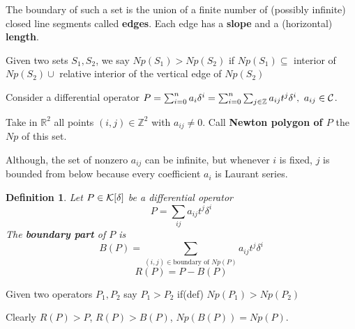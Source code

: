 \documentclass[11pt]{article}
\newtheorem{dfn}[thm]{Definition}
\newcommand{\reals}{\mathbb R}
\newcommand{\intg}{\mathbb Z}
\newcommand{\calc}{{\cal C}}
\newcommand{\calk}{{\cal K}}
\begin{document}
The boundary of such a set is the union of a finite number of (possibly infinite) closed line segments called \textbf{edges}. Each edge has a \textbf{slope} and a (horizontal) \textbf{length}.

Given two sets $S_1,S_2$, we say $Np(S_1)>Np(S_2)$ if $Np(S_1)\subseteq $ interior of $Np(S_2)\cup$ relative interior of the vertical edge of $Np(S_2)$


Consider a differential operator
$P=\sum^n_{i=0}a_i\delta^i=\sum^n_{i=0}\sum_{j\in \intg}a_{ij}t^j\delta^i,\ a_{ij}\in\calc$.

Take in $\reals^2$ all points $(i,j)\in \intg^2$ with $a_{ij}\neq 0$. Call \textbf{Newton polygon of $P$} the $Np$ of this set.

Although, the set of nonzero $a_{ij}$ can be infinite, but whenever $i$ is fixed, $j$ is bounded from below because every coefficient $a_i$ is Laurant series.

\begin{dfn}
Let $P\in \calk[\delta]$ be a differential operator
$$
P=\sum_{ij}a_{ij}t^j\delta^i
$$
The \textbf{boundary part} of $P$ is 
$$
B(P)=\sum_{(i,j) \in \text{boundary of } Np(P)} a_{ij}t^j\delta^i
$$ 
$$
R(P)=P-B(P)
$$
\end{dfn}
Given two operators $P_1,P_2$ say $P_1>P_2$ if(def) $Np(P_1)>Np(P_2)$

Clearly
$R(P)>P$, $R(P)>B(P)$, $Np(B(P))=Np(P)$.
\end{document}
